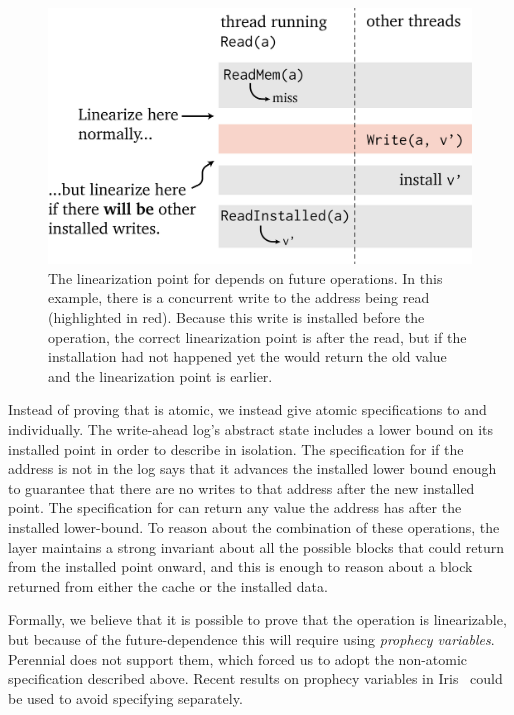 \begin{figure}[ht]
\includegraphics{fig/future-read.png}
\caption[Future-dependent linearization point for WAL's Read operation]{The
linearization point for  depends on future operations. In
this example, there is a concurrent write to the address being read
(highlighted in red). Because this write is installed before the
 operation, the correct linearization point is after the read,
but if the installation had not happened yet the  would return the old
value and the linearization point is earlier.}
\label{fig:wal:future-read}
\end{figure}

Instead of proving that  is atomic, we instead give atomic specifications to
 and  individually. The write-ahead log's
abstract state includes a lower bound on its installed point in order to
describe  in isolation. The specification for 
if the address is not in the log says that it
advances the installed lower bound enough to guarantee that there are no writes
to that address after the new installed point. The specification for
 can return any value the address has after the
installed lower-bound. To reason about the combination of these operations, the
 layer maintains a strong invariant about all the possible blocks that
 could return from the installed point onward, and this is enough to
reason about a block returned from either the cache or the installed data.

Formally, we believe that it is possible to prove that the  
operation is linearizable, but because of the future-dependence this
will require using \emph{prophecy variables}.  Perennial
does not support them, which forced us to adopt the non-atomic
specification described above.  Recent results on prophecy variables
in Iris~\cite{jung:prophecy} could be used to avoid specifying
 separately.
